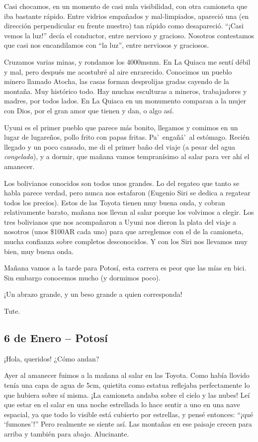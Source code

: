 Casi chocamos, en un momento de casi nula visibilidad, con otra camioneta que
iba bastante rápido. Entre vidrios empañados y mal-limpiados, apareció una
(en dirección perpendicular en frente nuestro) tan rápido como desapareció.
``¡Casi vemos la luz!'' decía el conductor, entre nervioso y
gracioso. Nosotros contestamos que casi nos encandilamos con ``la luz'', entre
nerviosos y graciosos.

Cruzamos varias minas, y rondamos los 4000msnm. En La Quiaca me sentí débil y
mal, pero después me acostubré al aire enrarecido. Conocimos un pueblo minero
llamado Atocha, las casas forman desprolijas gradas cayendo de la montaña. Muy
histórico todo. Hay muchas esculturas a mineros, trabajadores y madres, por
todos lados. En La Quiaca en un monumento comparan a la mujer con Dios, por el
gran amor que tienen y dan, o algo así.

Uyuni es el primer pueblo que parece más bonito, llegamos y comimos en un lugar
de lugareños, pollo frito con papas fritas. Pa'\ engañá'\ al estómago.
Recién llegado y un poco cansado, me di el primer baño del viaje (a pesar del
agua \emph{congelada}), y a dormir, que mañana vamos tempranísimo al salar
para ver ahí el amanecer.

Los bolivianos conocidos son todos unos grandes. Lo del regateo que tanto se
habla parece verdad, pero nunca nos estafaron (Eugenio Siri se dedica a regatear
todos los precios). Estos de las Toyota tienen muy buena onda, y cobran
relativamente barato, mañana nos llevan al salar porque los volvimos a elegir.
Los tres bolivianos que nos acompañaron a Uyuni nos dieron la plata del viaje
a nosotros (unos \$100{\small AR} cada uno) para que arreglemos con el de
la camioneta, mucha confianza sobre completos desconocidos. Y con los Siri nos
llevamos muy bien, muy buena onda.

Mañana vamos a la tarde para Potosí, esta carrera es peor que las mías en
bici. Sin embargo conocemos mucho (y dormimos poco).

¡Un abrazo grande, y un beso grande a quien corresponda!

Tute.

\subsection*{6 de Enero -- Potosí}

¡Hola, queridos! ¿Cómo andan?

Ayer al amanecer fuimos a la mañana al salar en las Toyota. Como había
llovido tenía una capa de agua de 5cm, quietita como estatua reflejaba
perfectamente lo que hubiera sobre sí misma. ¡La camioneta
andaba sobre el cielo y las nubes! Leí que estar en el salar en una noche
estrellada lo hace sentir a uno en una nave espacial, ya que todo lo visible
está cubierto por estrellas, y pensé entonces: ``¡qué
`fumones'!'' Pero realmente se siente así. Las montañas en ese paisaje
crecen para arriba y también para abajo. Alucinante.

